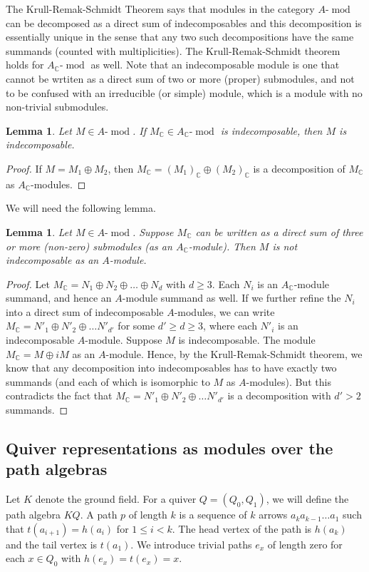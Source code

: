 \documentclass[11pt]{amsart}
\newtheorem{lemma}[theorem]{Lemma}
\theoremstyle{definition}
\newcommand{\C}{{\mathbb C}}
\newcommand{\Mod}{\operatorname{mod}}
\begin{document}
The Krull-Remak-Schmidt Theorem says that modules in the category $A\text{-}\Mod$ can be decomposed as a direct sum of indecomposables and this decomposition
is essentially unique in the sense that  any two such decompositions  have the same summands (counted with multiplicities). The Krull-Remak-Schmidt theorem holds for $A_\C\text{-}\Mod$ as well. Note that an indecomposable module is one that cannot be wrtiten as a direct sum of two or more (proper) submodules, and not to be confused with an irreducible (or simple) module, which is a module with no non-trivial submodules.

\begin{lemma}
Let $M \in A\text{-}\Mod$. If $M_\C \in A_\C\text{-}\Mod$ is indecomposable, then $M$ is indecomposable.
\end{lemma}

\begin{proof}
If $M = M_1 \oplus M_2$, then $M_\C = (M_1)_\C \oplus (M_2)_\C$ is a decomposition of $M_\C$ as $A_\C$-modules.
\end{proof}

We will need the following lemma.

\begin{lemma} \label{lem.3indec}
Let $M \in A\text{-}\Mod$. Suppose $M_\C$ can be written as a direct sum of three or more (non-zero) submodules (as an $A_\C$-module). Then $M$ is not indecomposable as an $A$-module.
\end{lemma}

\begin{proof}
Let $M_\C = N_1 \oplus N_2 \oplus \dots \oplus N_d$ with $d \geq 3$. Each $N_i$ is an $A_\C$-module summand, and hence an $A$-module summand as well. If we further refine the $N_i$ into a direct sum of indecomposable $A$-modules, we can write $M_\C = N'_1 \oplus N'_2 \oplus \dots N'_{d'}$ for some $d' \geq d \geq 3$, where each $N'_i$ is an indecomposable $A$-module. Suppose $M$ is indecomposable. The module $M_\C  = M \oplus i M$ as an $A$-module. Hence, by the Krull-Remak-Schmidt theorem, we know that any decomposition into indecomposables has to have exactly two summands (and each of which is isomorphic to $M$ as $A$-modules). But this contradicts the fact that $M_\C = N'_1 \oplus N'_2 \oplus \dots N'_{d'}$ is a decomposition with $d' > 2$ summands.
\end{proof}




\subsection{Quiver representations as modules over the path algebras}
Let $K$ denote the ground field. For a quiver $Q = (Q_0,Q_1)$, we will define the path algebra $KQ$. A path $p$ of length $k$ is a sequence of $k$ arrows $a_ka_{k-1}\dots a_1$ such that $t(a_{i+1}) = h(a_i)$ for $1 \leq i < k$. The head vertex of the path is $h(a_k)$ and the tail vertex is $t(a_1)$. We introduce trivial paths $e_x$ of length zero for each $x \in Q_0$ with $h(e_x) = t(e_x) = x$.
\end{document}

